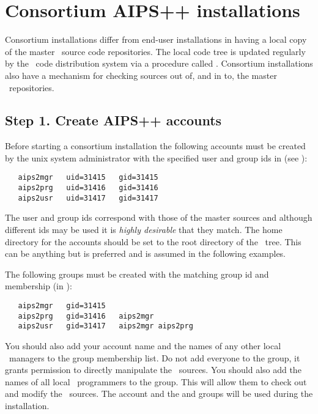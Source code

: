 \section{Consortium AIPS++ installations}
\label{Consortium installation}

Consortium installations differ from end-user installations in having a local
copy of the master \cvs\ source code repositories. 
The local code tree is updated regularly by the \aipspp\ code
distribution system via a procedure called .  Consortium
installations also have a mechanism for checking sources out of, and in to,
the master \cvs\ repositories.

\subsection*{Step 1. Create AIPS++ accounts}

Before starting a consortium installation the following accounts must be
created by the unix system administrator with the specified user and group ids
in  (see ):

\begin{verbatim}
   aips2mgr   uid=31415   gid=31415
   aips2prg   uid=31416   gid=31416
   aips2usr   uid=31417   gid=31417
\end{verbatim}

\noindent
The user and group ids correspond with those of the master sources and
although different ids may be used it is {\em highly desirable} that they
match.  The home directory for the accounts should be set to the root
directory of the \aipspp\ tree.  This can be anything but  is
preferred and is assumed in the following examples.

The following groups must be created with the matching group id and membership
(in ):

\begin{verbatim}
   aips2mgr   gid=31415
   aips2prg   gid=31416   aips2mgr
   aips2usr   gid=31417   aips2mgr aips2prg
\end{verbatim}

\noindent
You should also add your account name and the names of any other local
\aipspp\ managers to the  group membership list.  Do not add
everyone to the  group, it grants permission to directly
manipulate the \rcs\ sources.  You should also add the names of all local
\aipspp\ programmers to the  group.  This will allow them to
check out and modify the \aipspp\ sources.  The  account and the
 and  groups will be used during the installation.

